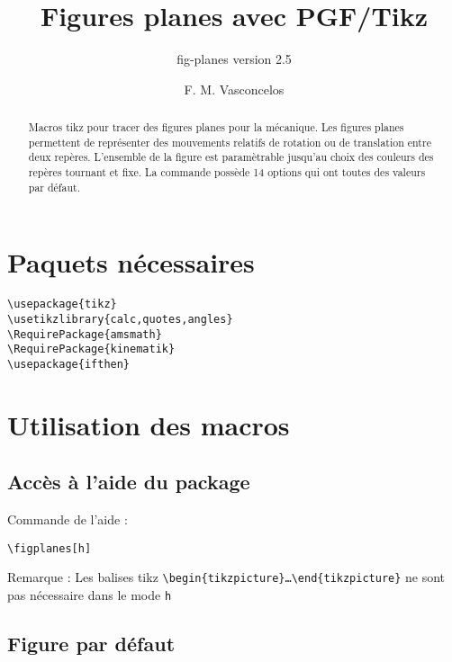 \documentclass[a4paper,9pt]{article}
\title{Figures planes avec PGF/Tikz}
\subtitle{fig-planes version 2.5}
\author{F. M. Vasconcelos}
\date{}
\begin{document}
\maketitle
\begin{abstract}
Macros tikz pour tracer des figures planes pour la mécanique. Les figures planes
permettent de représenter des mouvements relatifs de rotation ou 
de translation entre deux repères.
L'ensemble de la figure est paramètrable jusqu'au choix des couleurs des repères 
tournant et fixe. La commande possède 14 options qui ont toutes des valeurs 
par défaut. 
\end{abstract}

\section{Paquets nécessaires}                                                         
\begin{verbatim}                                                                      
\usepackage{tikz}
\usetikzlibrary{calc,quotes,angles}
\RequirePackage{amsmath}
\RequirePackage{kinematik}
\usepackage{ifthen}
\end{verbatim} 
\section{Utilisation des macros}                                                         
\subsection*{Accès à l'aide du package}

\figplanes[h]

Commande de l'aide :
\begin{verbatim}
\figplanes[h]
\end{verbatim}
Remarque :
Les balises tikz \texttt{\textbackslash begin\{tikzpicture\}\ldots \textbackslash end\{tikzpicture\}} ne 
sont pas nécessaire dans le mode \texttt{h}

\subsection*{Figure par défaut}
\end{document}

